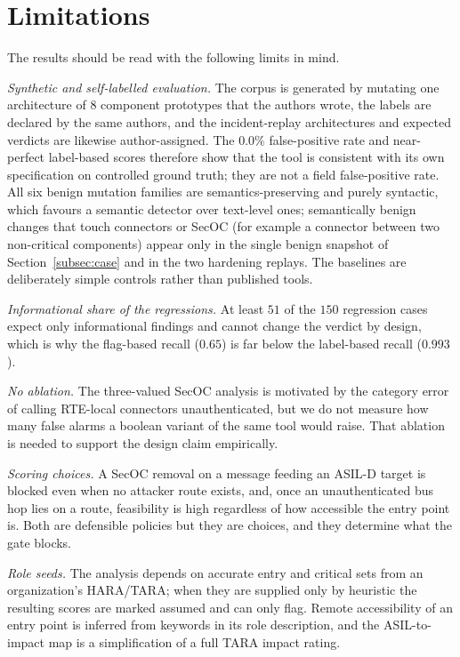 \documentclass[journal]{IEEEtran}
\begin{document}
\section{Limitations}
\label{sec:discussion}

The results should be read with the following limits in mind.

\emph{Synthetic and self-labelled evaluation.} The corpus is generated by
mutating one architecture of $8$ component prototypes that the authors wrote,
the labels are declared by the same authors, and the incident-replay
architectures and expected verdicts are likewise author-assigned. The
$0.0\%$ false-positive rate and near-perfect label-based scores therefore show
that the tool is consistent with its own specification on controlled ground
truth; they are not a field false-positive rate. All six benign mutation
families are semantics-preserving and purely syntactic, which favours a semantic
detector over text-level ones; semantically benign changes that touch connectors
or SecOC (for example a connector between two non-critical components) appear
only in the single benign snapshot of Section~\ref{subsec:case} and in the two
hardening replays. The baselines are deliberately simple controls rather than
published tools.

\emph{Informational share of the regressions.} At least $51$ of the $150$
regression cases expect only informational findings and cannot change the
verdict by design, which is why the flag-based recall ($0.65$) is far below the
label-based recall ($0.993$).

\emph{No ablation.} The three-valued SecOC analysis is motivated by the
category error of calling RTE-local connectors unauthenticated, but we do not
measure how many false alarms a boolean variant of the same tool would raise.
That ablation is needed to support the design claim empirically.

\emph{Scoring choices.} A SecOC removal on a message feeding an ASIL-D target is
blocked even when no attacker route exists, and, once an unauthenticated bus hop
lies on a route, feasibility is high regardless of how accessible the entry
point is. Both are defensible policies but they are choices, and they determine
what the gate blocks.

\emph{Role seeds.} The analysis depends on accurate entry and critical sets from
an organization's HARA/TARA; when they are supplied only by heuristic the
resulting scores are marked assumed and can only flag. Remote accessibility of an
entry point is inferred from keywords in its role description, and the
ASIL-to-impact map is a simplification of a full TARA impact rating.
\end{document}
